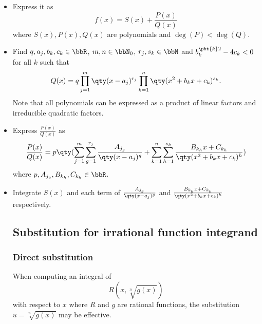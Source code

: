 \documentclass[a4paper,12pt]{report}
\begin{document}
\begin{itemize}
\begin{itemize}
\subsubsection{Integration of Rational Functions by Partial Fractions}
To compute the integral of any arbitrary rational function $f(x)$,
\ben
\item Express it as
\[f(x)=S(x)+\frac{P(x)}{Q(x)}\]
where $S(x),P(x),Q(x)$ are polynomials and $\deg(P)<\deg(Q)$.
\item Find $q,a_j,b_k,c_k\in\bbR$, $m,n\in\bbN_0$, $r_j,s_k\in\bbN$ and $b_k^{\pht{k}2}-4c_k<0$ for all $k$ such that
\[Q(x)=q\prod_{j=1}^m\qty(x-a_j)^{r_j}\prod_{k=1}^n\qty(x^2+b_kx+c_k)^{s_k}.\]
Note that all polynomials can be expressed as a product of linear factors and irreducible quadratic factors.
\item Express $\frac{P(x)}{Q(x)}$ as
\[\frac{P(x)}{Q(x)}=p\qty(\sum_{j=1}^m\sum_{g=1}^{r_j}\frac{A_{j_g}}{\qty(x-a_j)^g}+\sum_{k=1}^n\sum_{h=1}^{s_k}\frac{B_{k_h}x+C_{k_h}}{\qty(x^2+b_kx+c_k)^h})\]
where $p,A_{j_g},B_{k_h},C_{k_h}\in\bbR$.
\item Integrate $S(x)$ and each term of $\frac{A_{j_g}}{\qty(x-a_j)^g}$ and $\frac{B_{k_h}x+C_{k_h}}{\qty(x^2+b_kx+c_k)^h}$ respectively.
\een
\subsection{Substitution for irrational function integrand}
\subsubsection{Direct substitution}
When computing an integral of
\[R(x,\sqrt[n]{g(x)})\]
with respect to $x$ where $R$ and $g$ are rational functions, the substitution $u=\sqrt[n]{g(x)}$ may be effective.

\end{itemize}
\end{itemize}
\end{document}
